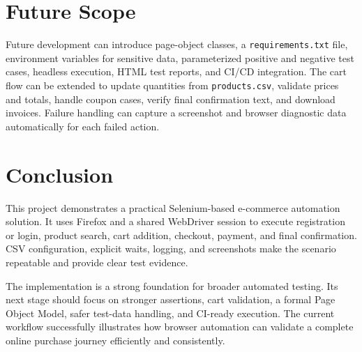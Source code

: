\documentclass[12pt,a4paper]{article}
\begin{document}
\section{Future Scope}
Future development can introduce page-object classes, a \texttt{requirements.txt} file, environment variables for sensitive data, parameterized positive and negative test cases, headless execution, HTML test reports, and CI/CD integration. The cart flow can be extended to update quantities from \texttt{products.csv}, validate prices and totals, handle coupon cases, verify final confirmation text, and download invoices. Failure handling can capture a screenshot and browser diagnostic data automatically for each failed action.

\section{Conclusion}
This project demonstrates a practical Selenium-based e-commerce automation solution. It uses Firefox and a shared WebDriver session to execute registration or login, product search, cart addition, checkout, payment, and final confirmation. CSV configuration, explicit waits, logging, and screenshots make the scenario repeatable and provide clear test evidence.

The implementation is a strong foundation for broader automated testing. Its next stage should focus on stronger assertions, cart validation, a formal Page Object Model, safer test-data handling, and CI-ready execution. The current workflow successfully illustrates how browser automation can validate a complete online purchase journey efficiently and consistently.
\end{document}
